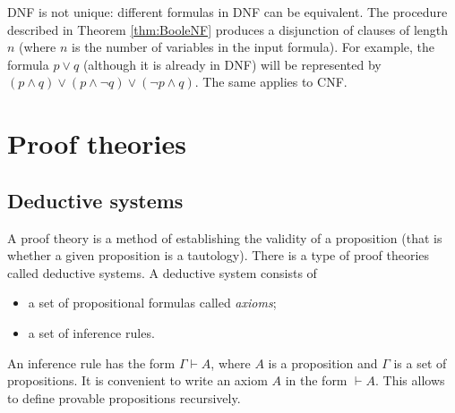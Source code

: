\begin{page}
\setcounter{section}{2}
\setcounter{subsection}{0}
\setcounter{dfn}{20}
\label{portion:472}


DNF is not unique: different formulas in DNF can be equivalent.
The procedure described in Theorem \ref{thm:BooleNF} produces a disjunction of clauses of length $n$ (where $n$ is the number of variables in the input formula).
For example, the formula $p \vee q$ (although it is already in DNF) will be represented by $(p \wedge q) \vee (p \wedge \neg q) \vee (\neg p \wedge q)$.
The same applies to CNF.




\end{page}

\begin{page}
\setcounter{section}{2}
\setcounter{subsection}{1}
\setcounter{dfn}{0}
\label{portion:474}

\section{Proof theories}

\end{page}

\begin{page}
\setcounter{section}{2}
\setcounter{subsection}{1}
\setcounter{dfn}{0}
\label{portion:476}

\subsection{Deductive systems}
A proof theory is a method of establishing the validity of a proposition (that is whether a given proposition is a tautology).
There is a type of proof theories called deductive systems.
A deductive system consists of
\begin{itemize}
\item a set of propositional formulas called \emph{axioms};
\item a set of inference rules.
\end{itemize}

An inference rule has the form $\Gamma \vdash A$, where $A$ is a proposition and $\Gamma$ is a set of propositions.
It is convenient to write an axiom $A$ in the form $\vdash A$.
This allows to define provable propositions recursively.


\end{page}

